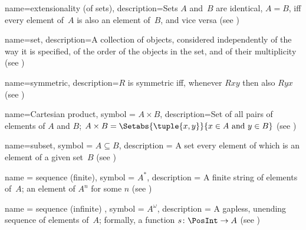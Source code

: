
 {
  name={extensionality (of sets)},  
  description={Sets $A$ and~$B$ are identical, $A = B$, iff every
    element of~$A$ is also an element of~$B$, and vice versa
    (see )}}


 {
  name=set,  
  description={A collection of objects, considered independently of
    the way it is specified, of the order of the objects in the set,
    and of their multiplicity (see )} }

 {
  name=symmetric,  
  description={$R$ is symmetric iff, whenever $Rxy$ then also $Ryx$
    (see )} }

 {
  name=Cartesian product,
  symbol = {\ensuremath{A \times B}},  
  description={Set of all pairs of {elements} of $A$ and $B$; $A
    \times B = \Setabs{\tuple{x, y}}{x \in A \text{ and } y \in B}$
    (see )} }

 {
  name=subset,
  symbol = {\ensuremath{A \subseteq B}},
  description = {A set every {element} of which is an {element} of
    a given set~$B$ (see )}  }

 {
  name = {sequence (finite)},
  symbol = {\ensuremath{A^*}},
  description = {A finite string of {element}s of~$A$; an
    {element} of $A^n$ for some $n$ (see
    )}}

 {
  name = {sequence (infinite) },
  symbol = {\ensuremath{A^\omega}},
  description = {A gapless, unending sequence of {element}s of~$A$;
    formally, a function $s\colon \PosInt \to A$ (see
    )}}

